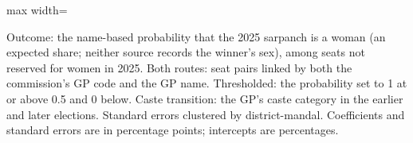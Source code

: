 \begin{adjustbox}{max width=\linewidth}
\begin{threeparttable}[b]
      \begin{tablenotes}
         \item Outcome: the name-based probability that the 2025 sarpanch is a woman (an expected share; neither source records the winner's sex), among seats not reserved for women in 2025. Both routes: seat pairs linked by both the commission's GP code and the GP name. Thresholded: the probability set to 1 at or above 0.5 and 0 below. Caste transition: the GP's caste category in the earlier and later elections. Standard errors clustered by district-mandal. Coefficients and standard errors are in percentage points; intercepts are percentages.
      \end{tablenotes}
   \end{threeparttable}
\end{adjustbox}
\par\endgroup


